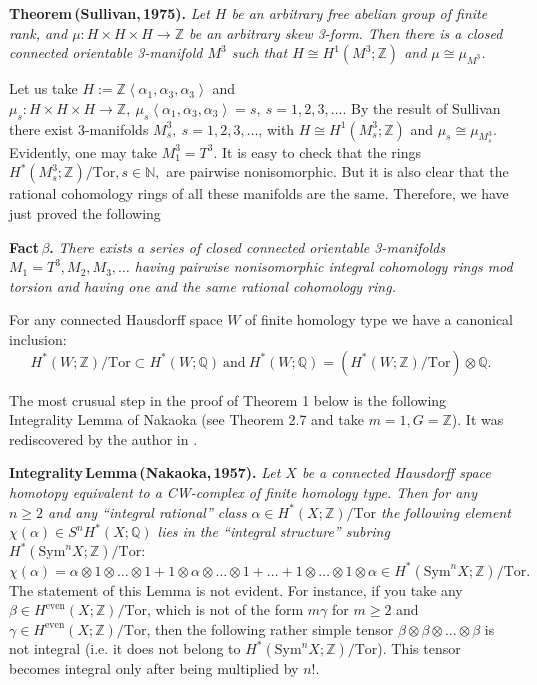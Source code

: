 \documentclass[a4paper,14pt]{article}
\newcommand{\Sym}{\mathrm{Sym}}
\newcommand{\Tor}{\mathrm{Tor}}
\newcommand{\even}{\mathrm{even}}
\newcommand{\Q}{\mathbb{Q}}
\newcommand{\Z}{\mathbb{Z}}
\newcommand{\N}{\mathbb{N}}
\begin{document}
\textbf{Theorem\,(Sullivan,\,1975).} {\it Let $H$ be an arbitrary free abelian group of finite rank, and $\mu\colon H\times H\times H \to \Z$ be an arbitrary skew 3-form. Then there is a closed connected orientable 3-manifold $M^3$ such that $H\cong H^1(M^3;\Z)$ and $\mu\cong \mu_{M^3}$.}


Let us take $H:= \Z\left<\alpha_1,\alpha_3,\alpha_3\right>$ and $\mu_s \colon H\times H\times H \to \Z, \  \mu_s\left<\alpha_1,\alpha_3,\alpha_3\right> = s, \  s=1,2,3,\ldots$. By the result of Sullivan there exist 3-manifolds $M^3_s, \ s=1,2,3,\ldots $, with $H\cong H^1(M^3_s;\Z)$ and $\mu_s\cong \mu_{M^3_s}$. Evidently, one may take $M^3_1= T^3$. It is easy to check that the rings $H^*(M^3_s;\Z)/\Tor, s\in \N,$ are pairwise nonisomorphic. But it is also clear that the rational cohomology rings of all these manifolds are the same. Therefore, we have just proved the following


{\bf Fact\,$\beta$.} {\it There exists a series of closed connected orientable 3-manifolds $M_1=T^3, M_2, M_3, \ldots$ having pairwise nonisomorphic integral cohomology rings mod torsion and having one and the same rational cohomology ring.} 

For any connected Hausdorff space $W$ of finite homology type we have a canonical inclusion:
$$
H^*(W;\Z)/\Tor \subset H^*(W;\Q) \  \mbox{and} \ H^*(W;\Q)=(H^*(W;\Z)/\Tor)\otimes \Q.
$$




The most crusual step in the proof of Theorem 1 below is the following Integrality Lemma of Nakaoka \cite{Nak} (see Theorem 2.7 and take $m=1, G=\Z$). It was rediscovered by the author in \cite{my5}. 

{\bf Integrality\,Lemma\,(Nakaoka,\,1957).} {\it Let $X$ be a connected Hausdorff space homotopy equivalent to a CW-complex of finite homology type. Then for any $n\ge 2$ and any ``integral rational'' class $\alpha\in H^*(X;\Z)/\Tor$ the following element $\chi(\alpha) \in S^n H^*(X;\Q)$ lies in the ``integral structure'' subring $H^*(\Sym^n X;\Z)/\Tor:$
$$
\chi(\alpha) = \alpha\otimes 1\otimes\ldots\otimes 1 + 1\otimes\alpha\otimes\ldots\otimes 1 +\ldots + 1\otimes\ldots\otimes 1\otimes\alpha \in H^*(\Sym^n X;\Z)/\Tor.
$$}
The statement of this Lemma is not evident. For instance, if you take any $\beta\in H^{\even}(X;\Z)/\Tor$, which is not of the form $m\gamma$ for $m\ge 2$ and $\gamma\in H^{\even}(X;\Z)/\Tor$, then the following rather simple tensor $\beta\otimes\beta\otimes \ldots\otimes \beta$ is not integral (i.e. it does not belong to $H^*(\Sym^n X;\Z)/\Tor$). This tensor becomes integral only after being multiplied by $n!$. 
\end{document}
